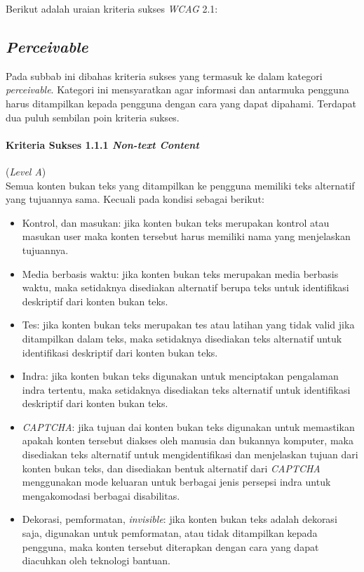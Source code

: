 Berikut adalah uraian kriteria sukses \textit{WCAG} 2.1:

\subsection{\textit{Perceivable}}
\label{subsec:kriteria_perceivable}

Pada subbab ini dibahas kriteria sukses yang termasuk ke dalam kategori \textit{perceivable}. Kategori ini mensyaratkan agar informasi dan antarmuka pengguna harus ditampilkan kepada pengguna dengan cara yang dapat dipahami. Terdapat dua puluh sembilan poin kriteria sukses.

\paragraph{Kriteria Sukses 1.1.1 \textit{Non-text Content}}
\label{subsec:kriteria_1.1.1}
(\textit{Level A})\\

Semua konten bukan teks yang ditampilkan ke pengguna memiliki teks alternatif yang tujuannya sama. Kecuali pada kondisi sebagai berikut:

\begin{itemize}
	\item Kontrol, dan masukan: jika konten bukan teks merupakan kontrol atau masukan user maka konten tersebut harus memiliki nama yang menjelaskan tujuannya.
	\item Media berbasis waktu: jika konten bukan teks merupakan media berbasis waktu, maka setidaknya disediakan alternatif berupa teks untuk identifikasi deskriptif dari konten bukan teks.
	\item Tes: jika konten bukan teks merupakan tes atau latihan yang tidak valid jika ditampilkan dalam teks, maka setidaknya disediakan teks alternatif untuk identifikasi deskriptif dari konten bukan teks.
	\item Indra: jika konten bukan teks digunakan untuk menciptakan pengalaman indra tertentu, maka setidaknya disediakan teks alternatif untuk identifikasi deskriptif dari konten bukan teks.
	\item \textit{CAPTCHA}: jika tujuan dai konten bukan teks digunakan untuk memastikan apakah konten tersebut diakses oleh manusia dan bukannya komputer, maka disediakan teks alternatif untuk mengidentifikasi dan menjelaskan tujuan dari konten bukan teks, dan disediakan bentuk alternatif dari \textit{CAPTCHA} menggunakan mode keluaran untuk berbagai jenis persepsi indra untuk mengakomodasi berbagai disabilitas.
	\item Dekorasi, pemformatan, \textit{invisible}: jika konten bukan teks adalah dekorasi saja, digunakan untuk pemformatan, atau tidak ditampilkan kepada pengguna, maka konten tersebut diterapkan dengan cara yang dapat diacuhkan oleh teknologi bantuan.
\end{itemize} 

